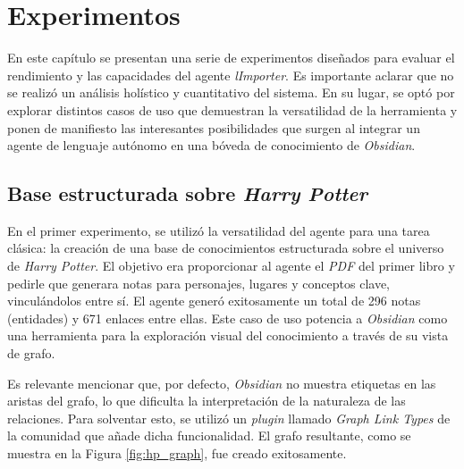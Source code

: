 \chapter{Experimentos}\label{chapter:implementation}
En este capítulo se presentan una serie de experimentos diseñados para evaluar el rendimiento y las capacidades del agente \textit{lImporter}. Es importante aclarar que no se realizó un análisis holístico y cuantitativo del sistema. En su lugar, se optó por explorar distintos casos de uso que demuestran la versatilidad de la herramienta y ponen de manifiesto las interesantes posibilidades que surgen al integrar un agente de lenguaje autónomo en una bóveda de conocimiento de \textit{Obsidian}.

\section{Base estructurada sobre \textit{Harry Potter}}
En el primer experimento, se utilizó la versatilidad del agente para una tarea clásica: la creación de una base de conocimientos estructurada sobre el universo de \textit{Harry Potter}. El objetivo era proporcionar al agente el \textit{PDF} del primer libro y pedirle que generara notas para personajes, lugares y conceptos clave, vinculándolos entre sí. El agente generó exitosamente un total de 296 notas (entidades) y 671 enlaces entre ellas. Este caso de uso potencia a \textit{Obsidian} como una herramienta para la exploración visual del conocimiento a través de su vista de grafo.

Es relevante mencionar que, por defecto, \textit{Obsidian} no muestra etiquetas en las aristas del grafo, lo que dificulta la interpretación de la naturaleza de las relaciones. Para solventar esto, se utilizó un \textit{plugin} llamado \textit{Graph Link Types} de la comunidad que añade dicha funcionalidad. El grafo resultante, como se muestra en la Figura \ref{fig:hp_graph}, fue creado exitosamente. 

